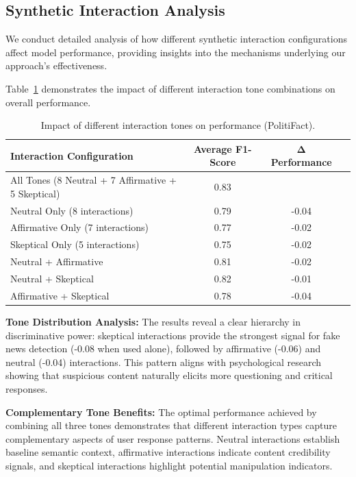 \subsection{Synthetic Interaction Analysis}

We conduct detailed analysis of how different synthetic interaction configurations affect model performance, providing insights into the mechanisms underlying our approach's effectiveness.

Table~\ref{tab:hyperparameter_interaction_politifact} demonstrates the impact of different interaction tone combinations on overall performance.

\begin{table}[htbp]
\centering
\caption{Impact of different interaction tones on performance (PolitiFact).}
\label{tab:hyperparameter_interaction_politifact}
\begin{tabular}{lccc}
\toprule
\textbf{Interaction Configuration} & \textbf{Average F1-Score} & \textbf{Δ Performance} \\
\midrule
All Tones (8 Neutral + 7 Affirmative + 5 Skeptical) & 0.83 & \- \\
\midrule
Neutral Only (8 interactions) & 0.79 & -0.04 \\
Affirmative Only (7 interactions) & 0.77 & -0.02 \\
Skeptical Only (5 interactions) & 0.75 & -0.02 \\
\midrule
Neutral + Affirmative & 0.81 & -0.02 \\
Neutral + Skeptical & 0.82 & -0.01 \\
Affirmative + Skeptical & 0.78 & -0.04 \\
\bottomrule
\end{tabular}
\end{table}

\textbf{Tone Distribution Analysis:} The results reveal a clear hierarchy in discriminative power: skeptical interactions provide the strongest signal for fake news detection (-0.08 when used alone), followed by affirmative (-0.06) and neutral (-0.04) interactions. This pattern aligns with psychological research showing that suspicious content naturally elicits more questioning and critical responses.

\textbf{Complementary Tone Benefits:} The optimal performance achieved by combining all three tones demonstrates that different interaction types capture complementary aspects of user response patterns. Neutral interactions establish baseline semantic context, affirmative interactions indicate content credibility signals, and skeptical interactions highlight potential manipulation indicators.


